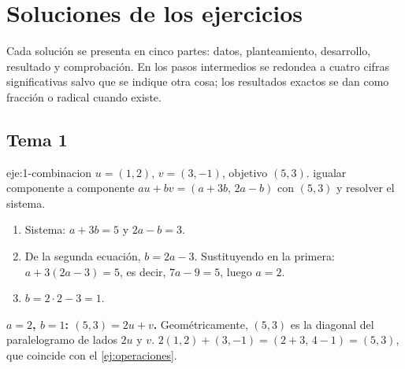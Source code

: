 \chapter{Soluciones de los ejercicios}
\label{ap:soluciones}

Cada solución se presenta en cinco partes: datos, planteamiento, desarrollo, resultado y comprobación. En los pasos intermedios se redondea a cuatro cifras significativas salvo que se indique otra cosa; los resultados exactos se dan como fracción o radical cuando existe.

\section{Tema 1}

\begin{solucion}{eje:1-combinacion}
\datos $u=(1,2)$, $v=(3,-1)$, objetivo $(5,3)$.
\planteamiento igualar componente a componente $au+bv=(a+3b,\,2a-b)$ con $(5,3)$ y resolver el sistema.
\pasos
\begin{enumerate}[label=\arabic*.]
  \item Sistema: $a+3b=5$ y $2a-b=3$.
  \item De la segunda ecuación, $b=2a-3$. Sustituyendo en la primera: $a+3(2a-3)=5$, es decir, $7a-9=5$, luego $a=2$.
  \item $b=2\cdot 2-3=1$.
\end{enumerate}
\resultado \textbf{$a=2$, $b=1$: $(5,3)=2u+v$.} Geométricamente, $(5,3)$ es la diagonal del paralelogramo de lados $2u$ y $v$.
\comprobacion $2(1,2)+(3,-1)=(2+3,\,4-1)=(5,3)$, que coincide con el \cref{ej:operaciones}.
\end{solucion}


